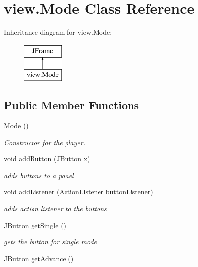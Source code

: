 \hypertarget{classview_1_1_mode}{}\section{view.\+Mode Class Reference}
\label{classview_1_1_mode}
Inheritance diagram for view.\+Mode\+:\begin{figure}[H]
\begin{center}
\leavevmode
\includegraphics[height=2.000000cm]{classview_1_1_mode}
\end{center}
\end{figure}
\subsection*{Public Member Functions}
\begin{DoxyCompactItemize}
\item 
\hyperlink{classview_1_1_mode_a55b668b8551b43596ab48afb749faec0}{Mode} ()
\begin{DoxyCompactList}\small\item\em Constructor for the player. \end{DoxyCompactList}\item 
void \hyperlink{classview_1_1_mode_a133b1b524c5ac2bb62da0f7f892c006d}{add\+Button} (J\+Button x)
\begin{DoxyCompactList}\small\item\em adds buttons to a panel \end{DoxyCompactList}\item 
void \hyperlink{classview_1_1_mode_a0f731453457f37dd1f3b16994a398c3e}{add\+Listener} (Action\+Listener button\+Listener)
\begin{DoxyCompactList}\small\item\em adds action listener to the buttons \end{DoxyCompactList}\item 
J\+Button \hyperlink{classview_1_1_mode_ad97ed0dc0beeb1f54affe3355846bf6a}{get\+Single} ()
\begin{DoxyCompactList}\small\item\em gets the button for single mode \end{DoxyCompactList}\item 
J\+Button \hyperlink{classview_1_1_mode_a28babd34398a9348027e0efa23d9549b}{get\+Advance} ()
\end{DoxyCompactItemize}

